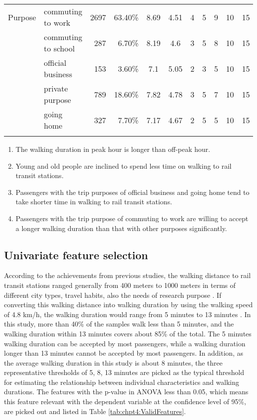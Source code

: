 \begin{sidewaystable}[htbp]
\begin{tabular}{llrrccccccc}
		\midrule
		\multicolumn{1}{l}{Purpose}
		& commuting to work   & 2697  & 63.40\% & 8.69  & 4.51  & 4     & 5     & 9     & 10    & 15 \\
		& commuting to school & 287   &  6.70\% & 8.19  & 4.6   & 3     & 5     & 8     & 10    & 15 \\
		& official business   & 153   &  3.60\% & 7.1   & 5.05  & 2     & 3     & 5     & 10    & 15 \\
		& private purpose     & 789   & 18.60\% & 7.82  & 4.78  & 3     & 5     & 7     & 10    & 15 \\
		& going home          & 327   &  7.70\% & 7.17  & 4.67  & 2     & 5     & 5     & 10    & 15 \\
		\Xhline{1.5pt}
	\end{tabular}
	\normalsize
\end{sidewaystable}

%
\begin{enumerate}
	\item The walking duration in peak hour is longer than off-peak hour.
	\item Young and old people are inclined to spend less time on walking to rail transit stations.
	\item Passengers with the trip purposes of official business and going home tend to take shorter time in walking to rail transit stations.
	\item Passengers with the trip purpose of commuting to work are willing to accept a longer walking duration than that with other purposes significantly.
\end{enumerate}

%
\subsection{Univariate feature selection}
According to the achievements from previous studies, the walking distance to rail transit stations ranged generally from 400 meters to 1000 meters in terms of different city types, travel habits, also the needs of research purpose \cite{guerra2012half,murray1998public,o1996walking,keijer2000people,zhao2003forecasting,alshalalfah2007case}. If converting this walking distance into walking duration by using the walking speed of 4.8 km/h, the walking duration would range from 5 minutes to 13 minutes \cite{bohannon1997comfortable}. In this study, more than 40\% of the samples walk less than 5 minutes, and the walking duration within 13 minutes covers about 85\% of the total. The 5 minutes walking duration can be accepted by most passengers, while a walking duration longer than 13 minutes cannot be accepted by most passengers. In addition, as the average walking duration in this study is about 8 minutes, the three representative thresholds of 5, 8, 13 minutes are picked as the typical threshold for estimating the relationship between individual characteristics and walking durations. The features with the p-value in ANOVA less than 0.05, which means this feature relevant with the dependent variable at the confidence level of 95\%, are picked out and listed in Table \ref{tab:chpt4:ValidFeatures}.

